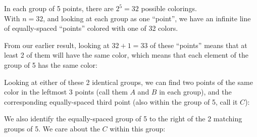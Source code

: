 \documentclass[11pt]{article}
\edef\getxnow(#1,#2){#1}
\edef\getynow(#1,#2){#2}
\newcommand*{\getx}[1]{\expandafter\getxnow#1}
\newcommand*{\gety}[1]{\expandafter\getynow#1}
\newcommand*{\scalePic}{0.4}
\newcommand*{\gridArg}[7]{%
    \foreach \x in {\fpeval{#1},\fpeval{#1+#2},...,\fpeval{#3+0.0001}} %
        \draw [black, thin, #7] (\x,\fpeval{#4}) -- (\x,\fpeval{#6+0.0001});
    \foreach \y in {\fpeval{#4},\fpeval{#4+#5},...,\fpeval{#6+0.0001}}
        \draw [black, thin, #7] (\fpeval{#1},\y) -- (\fpeval{#3+0.0001},\y);
}
\newcommand*{\grid}[6]{\gridArg{#1}{#2}{#3}{#4}{#5}{#6}{}}%
\newcommand*{\mybigbox}[4]{\grid{#1}{#3}{#1+#3}{#2}{#4}{#2+#4}} %
\newcommand*{\mybox}[2]{\mybigbox{#1}{#2}{1}{1}} %
\newcommand*{\myboxes}[1]{\foreach \pt in {#1} {\mybox{\getx{\pt}}{\gety{\pt}}}}
\newcommand*{\labelabove}[3]{\node[above, outer sep=5pt] at (#1 + 0.5, #2 + 0.5){#3};} %
\begin{document}
In each group of 5 points, there are $2^5 = 32$ possible colorings.\\
With $n=32$, and looking at each group as one ``point'', we have an infinite line of equally-spaced ``points'' colored with one of 32 colors.

From our earlier result, looking at $32+1=33$ of these ``points'' means that at least 2 of them will have the same color, which means that each element of the group of 5 has the same color:

\begin{center}
\end{center}

Looking at either of these 2 identical groups, we can find two points of the same color in the leftmost 3 points (call them $A$ and $B$ in each group), and the corresponding equally-spaced third point (also within the group of 5, call it $C$):

\begin{center}
\end{center}

We also identify the equally-spaced group of 5 to the right of the 2 matching groups of 5. We care about the $C$ within this group:

\begin{center}
\end{center}
\end{document}
